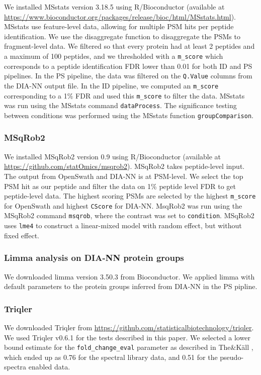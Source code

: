 \documentclass[10pt,letterpaper]{article}
\begin{document}
We installed MSstats version 3.18.5 using R/Bioconductor (available at \url{https://www.bioconductor.org/packages/release/bioc/html/MSstats.html}). MSstats use feature-level data, allowing for multiple PSM hits per peptide identification. We use the disaggregate function to disaggregate the PSMs to fragment-level data. We filtered so that every protein had at least 2 peptides and a maximum of 100 peptides, and we thresholded with a \texttt{m\_score} which corresponds to a peptide identification FDR lower than 0.01 for both ID and PS pipelines. In the PS pipeline, the data was filtered on the \texttt{Q.Value} columns from the DIA-NN output file. In the ID pipeline, we computed an \texttt{m\_score} corresponding to a 1\% FDR and used this \texttt{m\_score} to filter the data. MSstats was run using the MSstats command \texttt{dataProcess}. The significance testing between conditions was performed using the MSstats function \texttt{groupComparison}.  

\subsubsection*{MSqRob2}

We installed MSqRob2 version 0.9 using R/Bioconductor (available at \url{https://github.com/statOmics/msqrob2}). MSqRob2 takes peptide-level input. The output from OpenSwath and DIA-NN is at PSM-level. We select the top PSM hit as our peptide and filter the data on 1\% peptide level FDR to get peptide-level data. The highest scoring PSMs are selected by the highest \texttt{m\_score} for OpenSwath and highest \texttt{CScore} for DIA-NN. MsqRob2 was run using the MSqRob2 command \texttt{msqrob}, where the contrast was set to \texttt{condition}.
MSqRob2 uses \texttt{lme4} to construct a linear-mixed model with random effect, but without fixed effect. 
\subsubsection*{Limma analysis on DIA-NN protein groups}

We downloaded limma\cite{limma} version 3.50.3 from Bioconductor. We applied limma with default parameters to the protein groups inferred from DIA-NN in the PS pipline.  


\subsubsection*{Triqler}

We downloaded Triqler from \url{https://github.com/statisticalbiotechnology/triqler}. We used Triqler v0.6.1 for the tests described in this paper. We selected a lower bound estimate for the \texttt{fold\_change\_eval} parameter as described in The\&K\"{a}ll \cite{the2021triqler}, which ended up as 0.76 for the spectral library data, and 0.51 for the pseudo-spectra enabled data.
\end{document}
